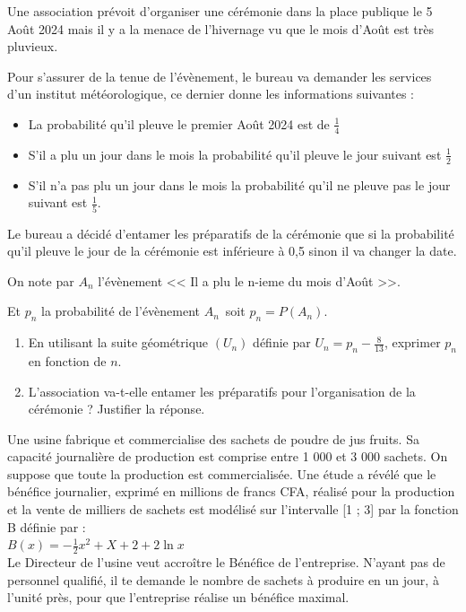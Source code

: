 \begin{exercice}
Une association prévoit d'organiser une cérémonie dans la place publique
le 5 Août 2024 mais il y a la menace de l'hivernage vu que le mois d'Août
est très pluvieux.

Pour s'assurer de la tenue de l'évènement, le bureau va demander les
services d'un institut météorologique, ce dernier donne les informations
suivantes :
\begin{itemize}
\item La probabilité qu'il pleuve le premier Août 2024 est de  $ \frac{1}{4} $
\item S'il a plu un jour dans le mois la probabilité qu'il pleuve le jour suivant est $ \frac{1}{2} $
\item S’il n'a pas plu un jour dans le mois la probabilité qu’il ne pleuve pas
le jour suivant est $ \frac{1}{5} $.
\end{itemize}
Le bureau a décidé d'entamer les préparatifs de la cérémonie que si la
probabilité qu'il pleuve le jour de la cérémonie est inférieure à 0,5 sinon il va
changer la date.

\noindent On note par $ A_n $ l'évènement << Il a plu le n-ieme du mois d'Août >>.

\noindent Et  $ p_n $ la probabilité de l'évènement \; $ A_n $\, soit   $p_n=P(A_n)$.
\begin{enumerate}
\item En utilisant la suite géométrique  $(U_  n)$ définie par  $U_n=p_n -\frac{8}{13}$, exprimer 
 $p_n$ en fonction de $n$.

\item L’association va-t-elle entamer les préparatifs pour l’organisation de la
cérémonie ? Justifier la réponse.
\end{enumerate} 
\end{exercice}
\begin{exercice}  
Une usine fabrique et commercialise des sachets de
poudre de jus fruits. Sa capacité journalière de
production est comprise entre 1 000 et 3 000
sachets. On suppose que toute la production est
commercialisée. Une étude a révélé que le bénéfice
journalier, exprimé en millions de francs CFA,
réalisé pour la production et la vente de milliers
de sachets est modélisé sur l'intervalle
[1 ; 3] par la fonction B définie par :\\
$ B(x)= -\frac{1}{2}x^2+X+2+2\ln x$\\
Le Directeur de l'usine veut accroître le Bénéfice
de l'entreprise. N'ayant pas de personnel qualifié,
il te demande le nombre de sachets à produire en
un jour, à l'unité près, pour que l'entreprise réalise
un bénéfice maximal.
\end{exercice} 

